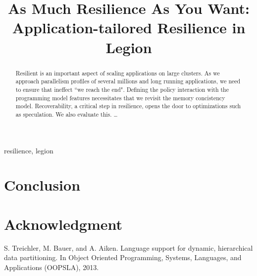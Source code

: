 \documentclass[conference]{IEEEtran}
\begin{document}
\title{As Much Resilience As You Want: \\Application-tailored Resilience in Legion}


\maketitle

\begin{abstract}
Resilient is an important aspect of scaling applications on
large clusters. As we approach parallelism profiles of several millions and long running applications, we need to ensure that ineffect ``we reach the end".
Defining the policy interaction with the programming model features necessitates that we revisit the memory concistency model. 
Recoverability, a critical step in
resilience, opens the door to optimizations such as speculation. We also
evaluate this.  \dots
\end{abstract}

\begin{IEEEkeywords}
resilience, legion
\end{IEEEkeywords}

















\section{Conclusion}

\section*{Acknowledgment}

\begin{thebibliography}{00}
 S. Treichler, M. Bauer, and A. Aiken. Language
support for dynamic, hierarchical data partitioning. In
Object Oriented Programming, Systems, Languages,
and Applications (OOPSLA), 2013.
\end{thebibliography}
\end{document}
